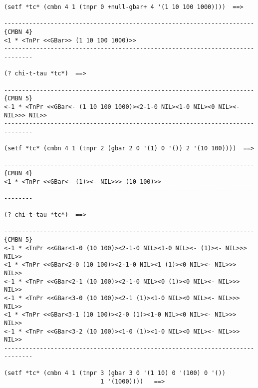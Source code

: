 {\begin{verbatim}
(setf *tc* (cmbn 4 1 (tnpr 0 +null-gbar+ 4 '(1 10 100 1000))))  ==>

----------------------------------------------------------------------{CMBN 4}
<1 * <TnPr <<GBar>> (1 10 100 1000)>>
------------------------------------------------------------------------------

(? chi-t-tau *tc*)  ==>

----------------------------------------------------------------------{CMBN 5}
<-1 * <TnPr <<GBar<- (1 10 100 1000)><2-1-0 NIL><1-0 NIL><0 NIL><- NIL>>> NIL>>
------------------------------------------------------------------------------

(setf *tc* (cmbn 4 1 (tnpr 2 (gbar 2 0 '(1) 0 '()) 2 '(10 100))))  ==>

----------------------------------------------------------------------{CMBN 4}
<1 * <TnPr <<GBar<- (1)><- NIL>>> (10 100)>>
------------------------------------------------------------------------------

(? chi-t-tau *tc*)  ==>

----------------------------------------------------------------------{CMBN 5}
<-1 * <TnPr <<GBar<1-0 (10 100)><2-1-0 NIL><1-0 NIL><- (1)><- NIL>>> NIL>>
<1 * <TnPr <<GBar<2-0 (10 100)><2-1-0 NIL><1 (1)><0 NIL><- NIL>>> NIL>>
<-1 * <TnPr <<GBar<2-1 (10 100)><2-1-0 NIL><0 (1)><0 NIL><- NIL>>> NIL>>
<-1 * <TnPr <<GBar<3-0 (10 100)><2-1 (1)><1-0 NIL><0 NIL><- NIL>>> NIL>>
<1 * <TnPr <<GBar<3-1 (10 100)><2-0 (1)><1-0 NIL><0 NIL><- NIL>>> NIL>>
<-1 * <TnPr <<GBar<3-2 (10 100)><1-0 (1)><1-0 NIL><0 NIL><- NIL>>> NIL>>
------------------------------------------------------------------------------

(setf *tc* (cmbn 4 1 (tnpr 3 (gbar 3 0 '(1 10) 0 '(100) 0 '())
                           1 '(1000))))   ==>
\end{verbatim}}
\newpage

